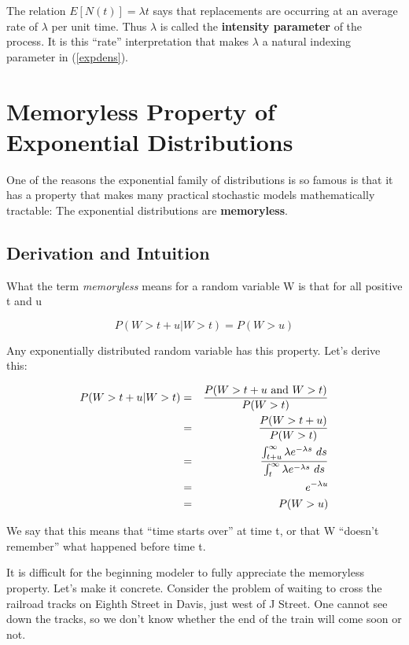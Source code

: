 The relation $E[N(t)] = \lambda t$ says that replacements are occurring
at an average rate of $\lambda$ per unit time.  Thus $\lambda$ is called
the {\bf intensity parameter} of the process.  It is this ``rate''
interpretation that makes $\lambda$ a natural indexing parameter in
(\ref{expdens}).

\section{Memoryless Property of Exponential Distributions}
\label{nomemxxx}

One of the reasons the exponential family of distributions is so famous
is that it has a property that makes many practical stochastic models
mathematically tractable:  The exponential distributions are
{\bf memoryless}.  

\subsection{Derivation and Intuition}

What the term {\it memoryless} means for a random variable W
is that for all positive t and u

\begin{equation}
\label{stmtnomemxxx}
P(W > t+u | W > t) = P(W > u)
\end{equation}

Any exponentially distributed random variable has this property.
Let's derive this:

\begin{eqnarray}
\label{nomemderivxxx}
P(W > t+u | W > t) &=& \frac{P(W > t+u {\rm ~and~} W > t)}{P(W > t)} \\ 
&=& \frac{P(W > t+u)}{P(W > t)} \\
&=&  \frac
{\int_{t+u}^{\infty} \lambda e^{-\lambda s}~ ds}
{\int_{t}^{\infty} \lambda e^{-\lambda s}~ ds} \\
&=& e^{-\lambda u} \\
&=& P(W > u)
\end{eqnarray}

We say that this means that ``time starts over'' at time t, or that W
``doesn't remember'' what happened before time t.

It is difficult for the beginning modeler to fully appreciate the
memoryless property.  Let's make it concrete.  Consider the problem of
waiting to cross the railroad tracks on Eighth Street in Davis, just
west of J Street. One cannot see down the tracks, so we don't know
whether the end of the train will come soon or not.

